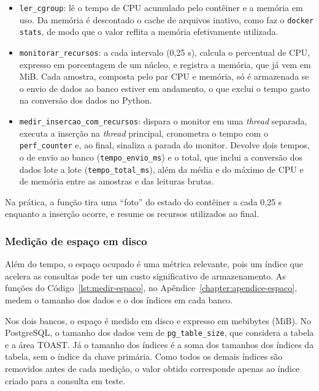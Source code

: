 \begin{itemize}
  \item \texttt{ler\_cgroup}: lê o tempo de CPU acumulado pelo contêiner e a 
  memória em uso. Da memória é descontado o cache de arquivos inativo, 
  como faz o \texttt{docker stats}, de modo que o valor reflita a memória efetivamente utilizada.
  \item \texttt{monitorar\_recursos}: a cada intervalo (0,25 s), calcula o percentual de 
  CPU, expresso em 
  porcentagem de um núcleo, e registra a memória, que já vem em MiB. Cada amostra, composta pelo par CPU e memória, só é 
  armazenada se o envio de dados ao banco estiver em andamento, 
  o que exclui o tempo gasto na conversão dos dados no Python.
  \item \texttt{medir\_insercao\_com\_recursos}: dispara o monitor em uma \textit{thread} 
  separada, executa a inserção na \textit{thread} principal, cronometra o tempo com o 
  \texttt{perf\_counter} e, ao final, sinaliza a parada do monitor. Devolve dois tempos, 
  o de envio ao banco (\texttt{tempo\_envio\_ms}) e o total, que inclui a conversão dos dados 
  lote a lote (\texttt{tempo\_total\_ms}), além da média e do máximo de CPU e de memória 
  entre as amostras e das leituras brutas.
\end{itemize}

Na prática, a função tira uma ``foto'' do estado do contêiner a cada 0,25 s
enquanto a inserção ocorre, e resume os recursos utilizados ao final.

\subsubsection{Medição de espaço em disco}
\label{subsec:medicao-espaco}

Além do tempo, o espaço ocupado é uma métrica relevante, pois um índice que
acelera as consultas pode ter um custo significativo de armazenamento. As
funções do Código~\ref{lst:medir-espaco}, no Apêndice~\ref{chapter:apendice-espaco}, medem o tamanho dos dados e o dos
índices em cada banco.

Nos dois bancos, o espaço é medido em disco e expresso em mebibytes (MiB). No PostgreSQL, o tamanho dos dados
vem de \texttt{pg\_table\_size}, que considera a tabela e a área TOAST.
Já o tamanho dos índices é a soma dos tamanhos dos índices da tabela, sem o índice da chave
primária. Como todos os demais índices são removidos antes de cada medição, o
valor obtido corresponde apenas ao índice criado para a consulta em teste.

